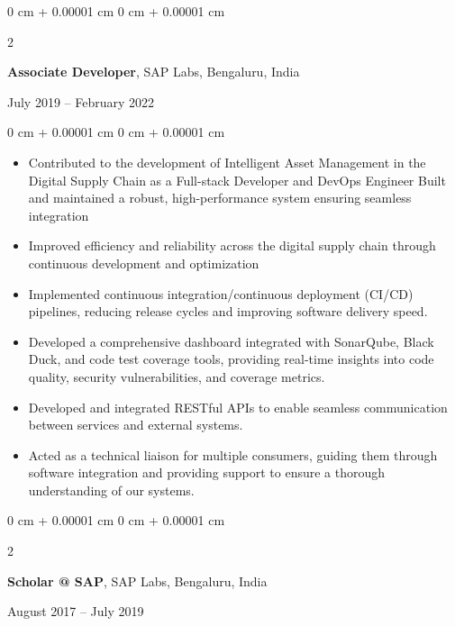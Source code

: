 \documentclass[10pt, letterpaper]{article}
\newenvironment{highlights}{
    \begin{itemize}[
        topsep=0.10 cm,
        parsep=0.10 cm,
        partopsep=0pt,
        itemsep=0pt,
        leftmargin=0 cm + 10pt
    ]
}{
    \end{itemize}
} %
\newenvironment{onecolentry}{
    \begin{adjustwidth}{
        0 cm + 0.00001 cm
    }{
        0 cm + 0.00001 cm
    }
}{
    \end{adjustwidth}
} %
\newenvironment{twocolentry}[2][]{
    \onecolentry
    \def\secondColumn{#2}
    \setcolumnwidth{\fill, 4.5 cm}
    \begin{paracol}{2}
}{
    \switchcolumn \raggedleft \secondColumn
    \end{paracol}
    \endonecolentry
} %
\begin{document}
        \vspace{0.2 cm}

        \begin{twocolentry}{
            July 2019 – February 2022
        }
            \textbf{Associate Developer}, SAP Labs, Bengaluru, India
        \end{twocolentry}

        \vspace{0.10 cm}
        \begin{onecolentry}
            \begin{highlights}
                \item Contributed to the development of Intelligent Asset Management in the Digital Supply Chain as a Full-stack Developer and DevOps Engineer Built and maintained a robust, high-performance system ensuring seamless integration
                \item Improved efficiency and reliability across the digital supply chain through continuous development and optimization
                \item Implemented continuous integration/continuous deployment (CI/CD) pipelines, reducing release cycles and improving software delivery speed.
                \item Developed a comprehensive dashboard integrated with SonarQube, Black Duck, and code test coverage tools, providing real-time insights into code quality, security vulnerabilities, and coverage metrics.
                \item Developed and integrated RESTful APIs to enable seamless communication between services and external systems.
                \item Acted as a technical liaison for multiple consumers, guiding them through software integration and providing support to ensure a thorough understanding of our systems.
            \end{highlights}
        \end{onecolentry}

        \vspace{0.2 cm}

        \begin{twocolentry}{
            August 2017 – July 2019
        }
            \textbf{Scholar @ SAP}, SAP Labs, Bengaluru, India
        \end{twocolentry}
\end{document}
